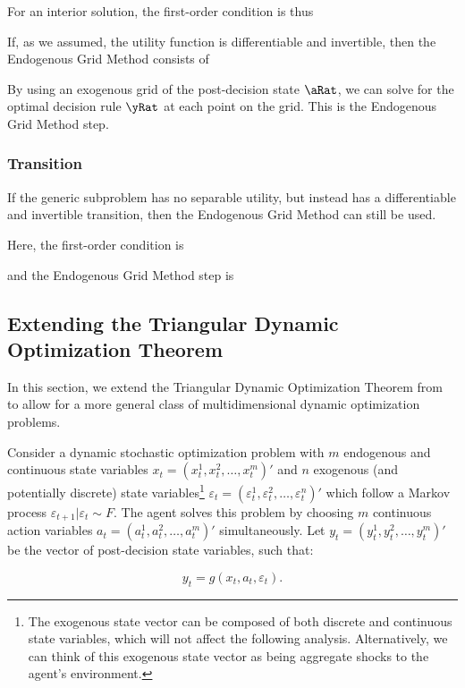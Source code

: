 \documentclass{article}
\begin{document}
For an interior solution, the first-order condition is thus

If, as we assumed, the utility function is differentiable and invertible, then the Endogenous Grid Method consists of

By using an exogenous grid of the post-decision state $\aRat$, we can solve for the optimal decision rule $\yRat$ at each point on the grid. This is the Endogenous Grid Method step.

\subsubsection{Transition}

If the generic subproblem has no separable utility, but instead has a differentiable and invertible transition, then the Endogenous Grid Method can still be used.

Here, the first-order condition is

and the Endogenous Grid Method step is

\subsection{Extending the Triangular Dynamic Optimization Theorem}

In this section, we extend the Triangular Dynamic Optimization Theorem from \cite{Iskhakov2015} to allow for a more general class of multidimensional dynamic optimization problems.

Consider a dynamic stochastic optimization problem with $m$ endogenous and continuous state variables $x_t = (x^1_t, x^2_t, \ldots, x^m_t)'$ and $n$ exogenous (and potentially discrete) state variables\footnote{The exogenous state vector can be composed of both discrete and continuous state variables, which will not affect the following analysis. Alternatively, we can think of this exogenous state vector as being aggregate shocks to the agent's environment.} $\varepsilon_t = (\varepsilon^1_t, \varepsilon^2_t, \ldots, \varepsilon^n_t)'$ which follow a Markov process $\varepsilon_{t+1} \lvert \varepsilon_t \sim F$. The agent solves this problem by choosing $m$ continuous action variables $a_t = (a^1_t, a^2_t, \ldots, a^m_t)'$ simultaneously. Let $y_t = (y^1_t, y^2_t, \ldots, y^m_t)'$ be the vector of post-decision state variables, such that:

\begin{equation}
y_t = g(x_t, a_t, \varepsilon_t).
\end{equation}
\end{document}
